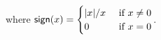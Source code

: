 \begin{proposition}
\begin{align}
\end{align}
where $\mathsf{sign}(x) = \begin{cases}|x|/x & \text{ if $x \neq 0$} \\ 0 & \text{ if $x = 0$}\end{cases}$.
\end{proposition}
%


